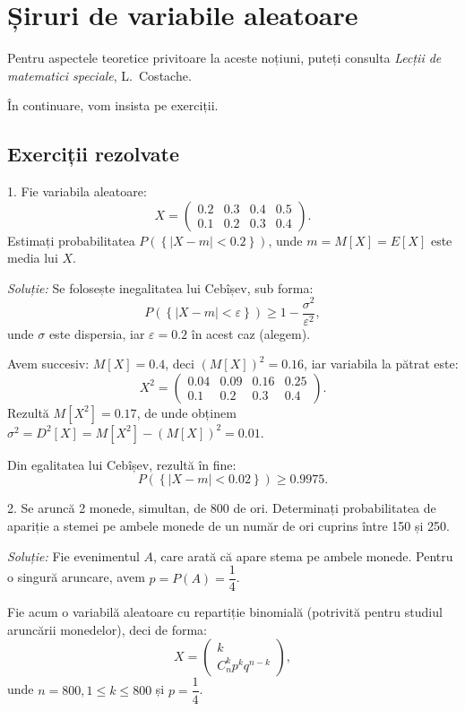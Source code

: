 
\chapter{Șiruri de variabile aleatoare}

Pentru aspectele teoretice privitoare la aceste noțiuni, puteți consulta
\emph{Lecții de matematici speciale}, L.\ Costache.

În continuare, vom insista pe exerciții.

\section{Exerciții rezolvate}

1. Fie variabila aleatoare:
\[
  X = \begin{pmatrix}
    0.2 & 0.3 & 0.4 & 0.5 \\
    0.1 & 0.2 & 0.3 & 0.4
  \end{pmatrix}.
\]
Estimați probabilitatea $ P\left( \left\{ |X - m| < 0.2 \right\} \right) $,
unde $ m = M[X] = E[X] $ este media lui $ X $.

\emph{Soluție:} Se folosește inegalitatea lui Cebîșev, sub forma:
\[
  P \left( \left\{ | X - m| < \varepsilon \right\} \right) \geq 1 - \dfrac{\sigma^2}{\varepsilon^2},
\]
unde $ \sigma $ este dispersia, iar $ \varepsilon = 0.2 $ în acest caz (alegem).

Avem succesiv: $ M[X] = 0.4 $, deci $ (M[X])^2 = 0.16 $, iar variabila la pătrat
este:
\[
  X^2 = \begin{pmatrix}
    0.04 & 0.09 & 0.16 & 0.25 \\
    0.1 & 0.2 & 0.3 & 0.4
  \end{pmatrix}.
\]
Rezultă $ M[X^2] = 0.17 $, de unde obținem
$ \sigma^2 = D^2[X] = M[X^2] - (M[X])^2 = 0.01 $.

Din egalitatea lui Cebîșev, rezultă în fine:
\[
  P\left( \left\{ | X - m | < 0.02 \right\} \right) \geq 0.9975.
\]

\vspace{0.3cm}

2. Se aruncă 2 monede, simultan, de 800 de ori. Determinați probabilitatea
de apariție a stemei pe ambele monede de un număr de ori cuprins între
150 și 250.

\emph{Soluție:} Fie evenimentul $ A $, care arată că apare stema pe ambele
monede. Pentru o singură aruncare, avem $ p = P(A) = \dfrac{1}{4} $.

Fie acum o variabilă aleatoare cu repartiție binomială (potrivită pentru
studiul aruncării monedelor), deci de forma:
\[
  X = \begin{pmatrix}
    k \\
    C_n^k p^k q^{n-k}
  \end{pmatrix},
\]
unde $ n = 800, 1 \leq k \leq 800 $ și $ p = \dfrac{1}{4} $.


